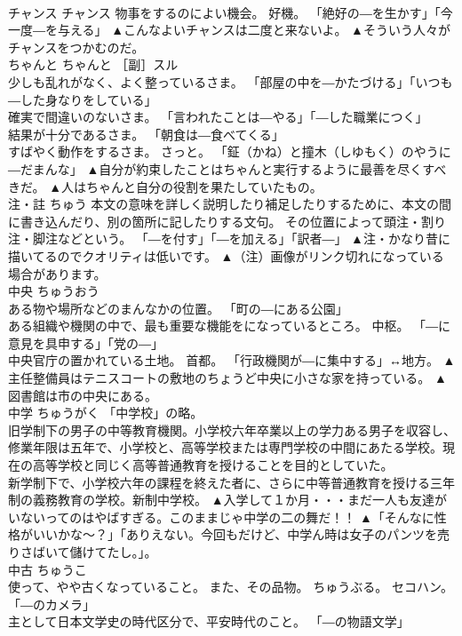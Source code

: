 \documentclass[8pt]{extreport}
\begin{document}
\begin{CJK}{UTF8}{min}
\\	チャンス	チャンス	物事をするのによい機会。 好機。 「絶好の―を生かす」「今一度―を与える」	▲こんなよいチャンスは二度と来ないよ。 ▲そういう人々がチャンスをつかむのだ。
\\	ちゃんと	ちゃんと	［副］スル 
\\	少しも乱れがなく、よく整っているさま。 「部屋の中を―かたづける」「いつも―した身なりをしている」 
\\	確実で間違いのないさま。 「言われたことは―やる」「―した職業につく」 
\\	結果が十分であるさま。 「朝食は―食べてくる」 
\\	すばやく動作をするさま。 さっと。 「鉦（かね）と撞木（しゆもく）のやうに―だまんな」	▲自分が約束したことはちゃんと実行するように最善を尽くすべきだ。 ▲人はちゃんと自分の役割を果たしていたもの。
\\	注・註	ちゅう	本文の意味を詳しく説明したり補足したりするために、本文の間に書き込んだり、別の箇所に記したりする文句。 その位置によって頭注・割り注・脚注などという。 「―を付す」「―を加える」「訳者―」	▲注・かなり昔に描いてるのでクオリティは低いです。 ▲（注）画像がリンク切れになっている場合があります。
\\	中央	ちゅうおう	
\\	ある物や場所などのまんなかの位置。 「町の―にある公園」 
\\	ある組織や機関の中で、最も重要な機能をになっているところ。 中枢。 「―に意見を具申する」「党の―」 
\\	中央官庁の置かれている土地。 首都。 「行政機関が―に集中する」↔地方。	▲主任整備員はテニスコートの敷地のちょうど中央に小さな家を持っている。 ▲図書館は市の中央にある。
\\	中学	ちゅうがく	「中学校」の略。 
\\	旧学制下の男子の中等教育機関。小学校六年卒業以上の学力ある男子を収容し、修業年限は五年で、小学校と、高等学校または専門学校の中間にあたる学校。現在の高等学校と同じく高等普通教育を授けることを目的としていた。 
\\	新学制下で、小学校六年の課程を終えた者に、さらに中等普通教育を授ける三年制の義務教育の学校。新制中学校。	▲入学して１か月・・・まだ一人も友達がいないってのはやばすぎる。このままじゃ中学の二の舞だ！！ ▲「そんなに性格がいいかな〜？」「ありえない。今回もだけど、中学ん時は女子のパンツを売りさばいて儲けてたし。」。
\\	中古	ちゅうこ	
\\	使って、やや古くなっていること。 また、その品物。 ちゅうぶる。 セコハン。 「―のカメラ」 
\\	主として日本文学史の時代区分で、平安時代のこと。 「―の物語文学」 

\end{CJK}
\end{document}
